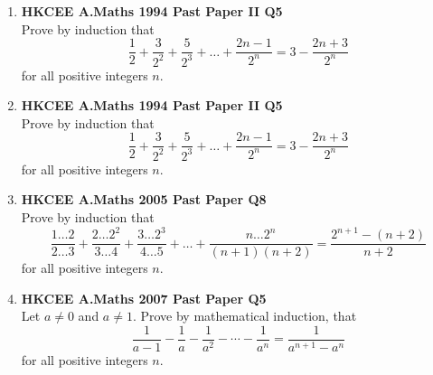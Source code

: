 \documentclass[12pt]{article}
\begin{document}
\begin{enumerate}
	\item \textbf{HKCEE A.Maths 1994 Past Paper II Q5}\\
	Prove by induction that $$\displaystyle \frac{1}{2}+\frac{3}{2^2}+\frac{5}{2^3}+\ldots+\frac{2n-1}{2^n}=3-\frac{2n+3}{2^n}$$ for all positive integers $n$.
	\newpage	
	\item \textbf{HKCEE A.Maths 1994 Past Paper II Q5}\\
	Prove by induction that $$\displaystyle \frac{1}{2}+\frac{3}{2^2}+\frac{5}{2^3}+\ldots+\frac{2n-1}{2^n}=3-\frac{2n+3}{2^n}$$ for all positive integers $n$.

	\item \textbf{HKCEE A.Maths 2005 Past Paper Q8}\\
	Prove by induction that $$\displaystyle \frac{1 \ldots 2}{2 \ldots 3}+\frac{2 \ldots 2^2}{3 \ldots 4}+\frac{3 \ldots 2^3}{4 \ldots 5}+\ldots+\frac{n\ldots 2^n}{(n+1)(n+2)}=\frac{2^{n+1}-(n+2)}{n+2}$$ for all positive integers $n$.

	\item \textbf{HKCEE A.Maths 2007 Past Paper Q5}\\
	Let $a \neq 0$ and $a \neq 1$. Prove by mathematical induction, that $$\displaystyle \frac{1}{a-1} - \frac{1}{a} - \frac{1}{a^2} - \cdots - \frac{1}{a^n} = \frac{1}{a^{n+1}-a^n}$$ for all positive integers $n$.

\end{enumerate}
\end{document}
